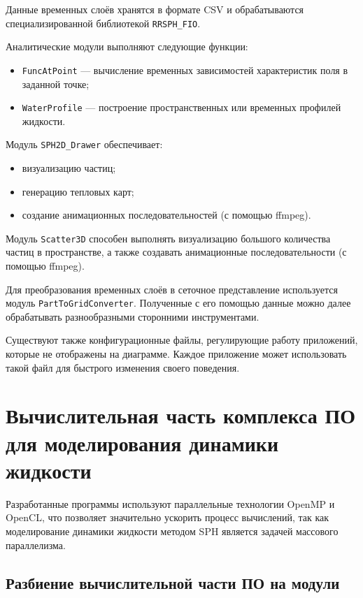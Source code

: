 Данные временных слоёв хранятся в формате CSV и обрабатываются специализированной библиотекой \verb|RRSPH_FIO|.

Аналитические модули выполняют следующие функции:
\begin{itemize}
    \item \verb|FuncAtPoint| --- вычисление временных зависимостей характеристик поля в заданной точке;
    \item \verb|WaterProfile| --- построение пространственных или временных профилей жидкости.
\end{itemize}

Модуль \verb|SPH2D_Drawer| обеспечивает:
\begin{itemize}
    \item визуализацию частиц;
    \item генерацию тепловых карт;
    \item создание анимационных последовательностей (с помощью ffmpeg).
\end{itemize}

Модуль \verb|Scatter3D| способен выполнять визуализацию большого количества частиц в пространстве,
а также создавать анимационные последовательности (с помощью ffmpeg).

Для преобразования временных слоёв в сеточное представление используется модуль \verb|PartToGridConverter|.
%
Полученные с его помощью данные можно далее обрабатывать разнообразными сторонними инструментами.

Существуют также конфигурационные файлы, регулирующие работу приложений, которые не отображены на диаграмме. 
Каждое приложение может использовать такой файл для быстрого изменения своего поведения.

\section{Вычислительная часть комплекса ПО для моделирования динамики жидкости}

Разработанные программы используют параллельные технологии OpenMP и OpenCL, 
что позволяет значительно ускорить процесс вычислений, 
так как моделирование динамики жидкости методом SPH является задачей массового параллелизма.

\subsection{Разбиение вычислительной части ПО на модули}

